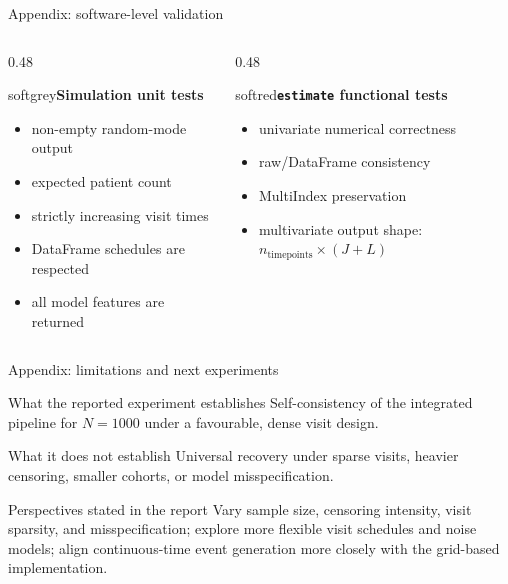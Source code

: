 \documentclass{beamer}
\newcommand{\softbox}[2]{%
  \begin{beamercolorbox}[rounded=true,sep=0.8ex,wd=\linewidth]{#1}#2\end{beamercolorbox}}
\begin{document}
\begin{frame}{Appendix: software-level validation}
  \begin{columns}[T,onlytextwidth]
    \begin{column}{0.48\textwidth}
      \softbox{softgrey}{\centering\textbf{Simulation unit tests}}
      \begin{itemize}
        \item non-empty random-mode output
        \item expected patient count
        \item strictly increasing visit times
        \item DataFrame schedules are respected
        \item all model features are returned
      \end{itemize}
    \end{column}
    \begin{column}{0.48\textwidth}
      \softbox{softred}{\centering\textbf{\texttt{estimate} functional tests}}
      \begin{itemize}
        \item univariate numerical correctness
        \item raw/DataFrame consistency
        \item MultiIndex preservation
        \item multivariate output shape:
          $n_{\mathrm{timepoints}}\times(J+L)$
      \end{itemize}
    \end{column}
  \end{columns}
\end{frame}

\begin{frame}{Appendix: limitations and next experiments}
  \begin{block}{What the reported experiment establishes}
    Self-consistency of the integrated pipeline for $N=1000$ under a favourable, dense visit design.
  \end{block}

  \begin{block}{What it does not establish}
    Universal recovery under sparse visits, heavier censoring, smaller cohorts, or model misspecification.
  \end{block}

  \begin{block}{Perspectives stated in the report}
    Vary sample size, censoring intensity, visit sparsity, and misspecification; explore more flexible visit schedules and noise models; align continuous-time event generation more closely with the grid-based implementation.
  \end{block}
\end{frame}
\end{document}
